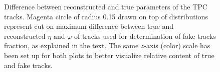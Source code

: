 \begin{figure}%
\centering
\parbox{0.4725\textwidth}{
  \centering
  \begin{subfigure}[b]{\linewidth}{
                }
  \end{subfigure}
}
\quad
\parbox{0.4725\textwidth}{
  \centering
  \begin{subfigure}[b]{\linewidth}{
                }
  \end{subfigure}
}%
\caption[Difference between reconstructed and true parameters of the TPC tracks.]{Difference between reconstructed and true parameters of the TPC tracks. Magenta circle of radius 0.15 drawn on top of distributions represent cut on maximum difference between true and reconstructed $\eta$ and $\varphi$ of tracks used for determination of fake tracks fraction, as explained in the text. The same $z$-axis (color) scale has been set up for both plots to better visualize relative content of true and fake tracks.} \label{fig:DeltaPhiVsDeltaEta}
\end{figure}


